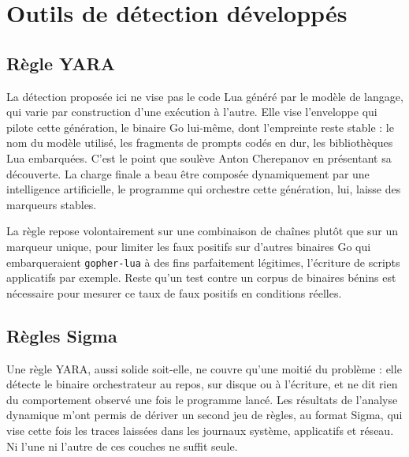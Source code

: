 \section{Outils de détection développés}

\subsection{Règle YARA}

La détection proposée ici ne vise pas le code Lua généré par le modèle de langage, qui varie par construction d'une exécution à l'autre. Elle vise l'enveloppe qui pilote cette génération, le binaire Go lui-même, dont l'empreinte reste stable : le nom du modèle utilisé, les fragments de prompts codés en dur, les bibliothèques Lua embarquées. C'est le point que soulève Anton Cherepanov en présentant sa découverte. La charge finale a beau être composée dynamiquement par une intelligence artificielle, le programme qui orchestre cette génération, lui, laisse des marqueurs stables.

La règle repose volontairement sur une combinaison de chaînes plutôt que sur un marqueur unique, pour limiter les faux positifs sur d'autres binaires Go qui embarqueraient \texttt{gopher-lua} à des fins parfaitement légitimes, l'écriture de scripts applicatifs par exemple. Reste qu'un test contre un corpus de binaires bénins est nécessaire pour mesurer ce taux de faux positifs en conditions réelles.

\subsection{Règles Sigma}

Une règle YARA, aussi solide soit-elle, ne couvre qu'une moitié du problème : elle détecte le binaire orchestrateur au repos, sur disque ou à l'écriture, et ne dit rien du comportement observé une fois le programme lancé. Les résultats de l'analyse dynamique m'ont permis de dériver un second jeu de règles, au format Sigma, qui vise cette fois les traces laissées dans les journaux système, applicatifs et réseau. Ni l'une ni l'autre de ces couches ne suffit seule.


